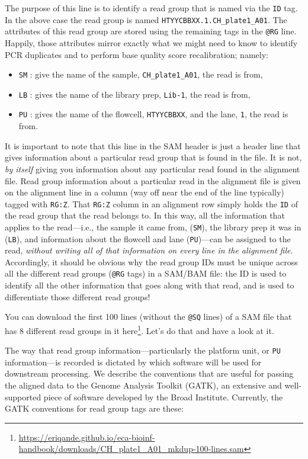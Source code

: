 \documentclass[]{krantz}
\providecommand{\tightlist}{%
  \setlength{\itemsep}{0pt}\setlength{\parskip}{0pt}}
\renewcommand{\href}[2]{#2\footnote{\url{#1}}}
\begin{document}
The purpose of this line is to identify a read group that is named via the \texttt{ID} tag. In the above
case the read group is named \texttt{HTYYCBBXX.1.CH\_plate1\_A01}. The attributes of this read group are stored
using the remaining tags in the \texttt{@RG} line. Happily, those attributes mirror exactly what we might need to know to
identify PCR duplicates and to perform base quality score recalibration; namely:

\begin{itemize}
\tightlist
\item
  \texttt{SM} : give the name of the sample, \texttt{CH\_plate1\_A01}, the read is from,
\item
  \texttt{LB} : gives the name of the library prep, \texttt{Lib-1}, the read is from,
\item
  \texttt{PU} : gives the name of the flowcell, \texttt{HTYYCBBXX}, and the lane, \texttt{1}, the read is from.
\end{itemize}

It is important to note that this line in the SAM header is just a header line that gives
information about a particular read group that is found in the file. It is not, \emph{by itself}
giving you information about any particular read found in the alignment file. Read group information
about a particular read in the alignment file is given on the alignment line in a column (way off near the
end of the line typically) tagged with \texttt{RG:Z}. That \texttt{RG:Z} column in an alignment row simply holds the \texttt{ID} of the read group
that the read belongs to. In this way, all the information that applies to the read---i.e., the sample it
came from, (\texttt{SM}), the library prep it was in (\texttt{LB}), and information about the flowcell and lane (\texttt{PU})---can
be assigned to the read, \emph{without writing all of that information on every line in the alignment file}.
Accordingly, it should be obvious why the read group IDs must be unique across all the different
read groups (\texttt{@RG} tags) in a SAM/BAM file: the ID is used to identify all the other information
that goes along with that read, and is used to differentiate those different read groups!

You can download the first 100 lines (without the \texttt{@SQ} lines) of a SAM file that has 8 different
read groups in it \href{https://eriqande.github.io/eca-bioinf-handbook/downloads/CH_plate1_A01_mkdup-100-lines.sam}{here}.
Let's do that and have a look at it.

The way that read group information---particularly the platform unit, or \texttt{PU} information---is recorded
is dictated by which software will be used for downstream processing.
We describe the
conventions that are useful for
passing the aligned data to the Genome Analysis Toolkit (GATK), an extensive
and well-supported piece
of software developed by the Broad Institute. Currently, the GATK conventions for
read group tags are these:
\end{document}
